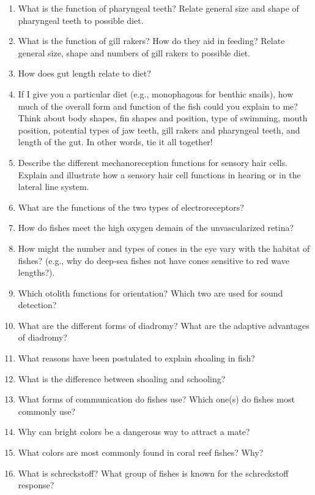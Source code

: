 \documentclass[nofonts, letterpaper]{tufte-handout}
\begin{document}
\begin{enumerate}
	\item What is the function of pharyngeal teeth?  Relate general size and shape of pharyngeal teeth to possible diet.

	\item What is the function of gill rakers?  How do they aid in feeding?  Relate general size, shape and numbers of gill rakers to possible diet.

	\item How does gut length relate to diet?

	\item If I give you a particular diet (e.g., monophagous for benthic snails), how much of the overall form and function of the fish could you explain to me?  Think about body shapes, fin shapes and position, type of swimming, mouth position, potential types of jaw teeth, gill rakers and pharyngeal teeth, and length of the gut.  In other words, tie it all together!

	\item Describe the different mechanoreception functions for sensory hair cells.  Explain and illustrate how a sensory hair cell functions in hearing or in the lateral line system.

	\item What are the functions of the two types of electroreceptors?

	\item How do fishes meet the high oxygen demain of the unvascularized retina?

	\item How might the number and types of cones in the eye vary with the habitat of fishes? (e.g., why do deep-sea fishes not have cones sensitive to red wave lengths?).

	\item Which otolith functions for orientation?  Which two are used for sound detection?

	\item What are the different forms of diadromy?  What are the adaptive advantages of diadromy?

	\item What reasons have been postulated to explain shoaling in fish?

	\item What is the difference between shoaling and schooling?

	\item What forms of communication do fishes use?  Which one(s) do fishes most commonly use?

	\item Why can bright colors be a dangerous way to attract a mate?

	\item What colors are most commonly found in coral reef fishes?  Why?

	\item What is schreckstoff?  What group of fishes is known for the schreckstoff response?
\end{enumerate}
\end{document}
